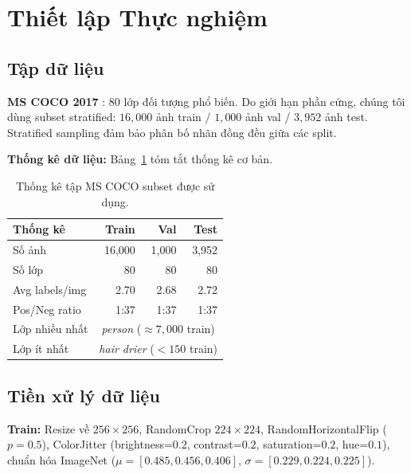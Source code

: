 \documentclass[conference]{IEEEtran}
\begin{document}
\section{Thiết lập Thực nghiệm}
\label{sec:exp}

\subsection{Tập dữ liệu}

\textbf{MS COCO 2017} \cite{lin2014microsoft}: 80 lớp đối tượng phổ biến.
Do giới hạn phần cứng, chúng tôi dùng subset stratified:
$16{,}000$ ảnh train / $1{,}000$ ảnh val / $3{,}952$ ảnh test.
Stratified sampling đảm bảo phân bố nhãn đồng đều giữa các split.

\textbf{Thống kê dữ liệu:}
Bảng~\ref{tab:dataset} tóm tắt thống kê cơ bản.

\begin{table}[t]
  \caption{Thống kê tập MS COCO subset được sử dụng.}
  \label{tab:dataset}
  \centering
  \begin{tabular}{lrrr}
    \toprule
    \textbf{Thống kê} & \textbf{Train} & \textbf{Val} & \textbf{Test} \\
    \midrule
    Số ảnh         & 16,000 & 1,000  & 3,952  \\
    Số lớp         & 80     & 80     & 80     \\
    Avg labels/img & 2.70   & 2.68   & 2.72   \\
    Pos/Neg ratio  & 1:37   & 1:37   & 1:37   \\
    Lớp nhiều nhất & \multicolumn{3}{c}{\textit{person} ($\approx 7,000$ train)} \\
    Lớp ít nhất   & \multicolumn{3}{c}{\textit{hair drier} ($<150$ train)} \\
    \bottomrule
  \end{tabular}
\end{table}

\subsection{Tiền xử lý dữ liệu}

\textbf{Train:} Resize về $256\times256$, RandomCrop $224\times224$,
RandomHorizontalFlip ($p=0.5$), ColorJitter (brightness=$0.2$, contrast=$0.2$,
saturation=$0.2$, hue=$0.1$), chuẩn hóa ImageNet
($\mu = [0.485, 0.456, 0.406]$, $\sigma = [0.229, 0.224, 0.225]$).
\end{document}
